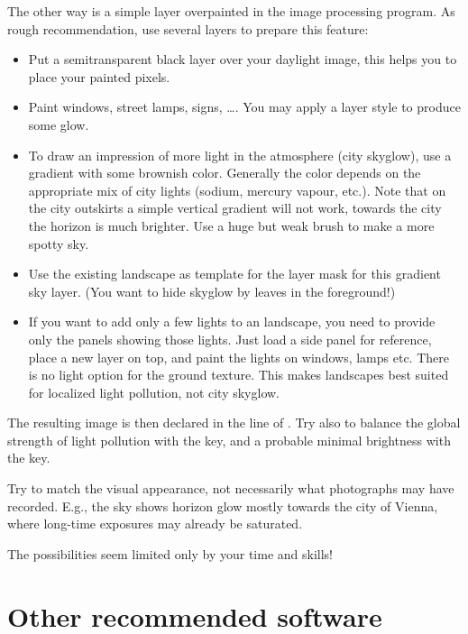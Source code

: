 The other way is a simple layer overpainted in the image processing
program. As rough recommendation, use several layers to prepare this
feature:
\begin{itemize}
\item Put a semitransparent black layer over your daylight image, this
  helps you to place your painted pixels.
\item Paint windows, street lamps, signs, \ldots. You may apply a
  layer style to produce some glow.
\item To draw an impression of more light in the atmosphere (city
  skyglow), use a gradient with some brownish color. Generally the
  color depends on the appropriate mix of city lights (sodium, mercury
  vapour, etc.). Note that on the city outskirts a simple vertical
  gradient will not work, towards the city the horizon is much
  brighter. Use a huge but weak brush to make a more spotty sky.
\item Use the existing landscape as template for the layer mask for
  this gradient sky layer. (You want to hide skyglow by leaves in the
  foreground!)
\item If you want to add only a few lights to an 
  landscape, you need to provide only the panels showing those
  lights. Just load a side panel for reference, place a new layer on
  top, and paint the lights on windows, lamps etc. There is no light
  option for the ground texture. This makes 
  landscapes best suited for localized light pollution, not city
  skyglow.
\end{itemize}

The resulting image is then declared in the  line
of . Try also to balance the global strength of
light pollution with the  key, and a probable
minimal brightness with the  key.

Try to match the visual appearance, not necessarily what photographs
may have recorded. E.g., the  sky shows horizon
glow mostly towards the city of Vienna, where long-time exposures may
already be saturated.

The possibilities seem limited only by your time and skills!

\section{Other recommended software}
\label{sec:landscapes:otherSoftware}

